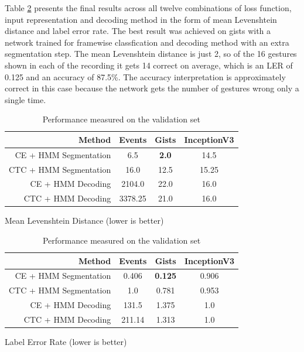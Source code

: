 Table \ref{tab:ler} presents the final results across all twelve combinations of
loss function, input representation and decoding method in the form of mean
Levenshtein distance and label error rate. The best result was achieved on gists
with a network trained for framewise classfication and decoding method with an
extra segmentation step. The mean Levenshtein distance is just 2, so of the 16
gestures shown in each of the recording it gets 14 correct on average, which is
an LER of 0.125 and an accuracy of 87.5\%. The accuracy interpretation is
approximately correct in this case because the network gets the number of
gestures wrong only a single time.

\begin{table}[h]
  \centering
  \begin{subtable}{\textwidth}
    \centering
    \begin{tabular}{r|c|c|c}
Method & Events & Gists & InceptionV3\\
\hline
CE + HMM Segmentation & 6.5 & \textbf{2.0} & 14.5\\
CTC + HMM Segmentation & 16.0 & 12.5 & 15.25\\
CE + HMM Decoding & 2104.0 & 22.0 & 16.0\\
CTC + HMM Decoding & 3378.25 & 21.0 & 16.0\\
    \end{tabular}
    \caption{Mean Levenshtein Distance (lower is better)}
  \end{subtable}
  \par\bigskip
  \begin{subtable}{\textwidth}
    \centering
    \begin{tabular}{r|c|c|c}
Method & Events & Gists & InceptionV3\\
\hline
CE + HMM Segmentation & 0.406 & \textbf{0.125} & 0.906\\
CTC + HMM Segmentation & 1.0 & 0.781 & 0.953\\
CE + HMM Decoding & 131.5 & 1.375 & 1.0\\
CTC + HMM Decoding & 211.14 & 1.313 & 1.0\\
    \end{tabular}
    \caption{Label Error Rate (lower is better)}
  \end{subtable}
  \caption{Performance measured on the validation set}
  \label{tab:ler}
\end{table}

